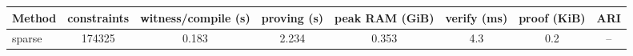 \begin{tabular}{lccccccc}
\toprule
Method & constraints & witness/compile (s) & proving (s) & peak RAM (GiB) & verify (ms) & proof (KiB) & ARI \\
\midrule
sparse & 174325 & 0.183 & 2.234 & 0.353 & 4.3 & 0.2 & -- \\
\bottomrule
\end{tabular}
